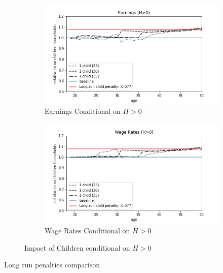 \begin{figure}[ht]
\begin{subfigure}{.5\textwidth}
  \centering
  \includegraphics[width=1\linewidth]{figures/extended_model_event_earnings_H>0.png}
  \caption{Earnings Conditional on $H > 0$}
  \label{fig:ext_model_event_earnings_alt}
\end{subfigure}%
\begin{subfigure}{.5\textwidth}
  \centering
  \includegraphics[width=1\linewidth]{figures/extended_model_event_wage_rates_H>0.png}
  \caption{Wage Rates Conditional on $H>0$}
  \label{fig:ext_model_event_wage_rates_alt}
\end{subfigure}
    \caption{Impact of Children conditional on $H>0$}
    \label{fig:ext_model_impact_alt}
\end{figure}


\begin{table}[ht]
    \centering
    
    \caption{Long run penalties comparison}
    \label{tab:extended_results}
\end{table}




